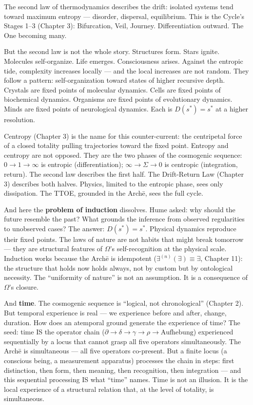 \documentclass[10pt, openany, oneside]{book}
\begin{document}
\vspace{1em}

\noindent The second law of thermodynamics describes the drift: isolated systems tend toward maximum entropy --- disorder, dispersal, equilibrium. This is the Cycle's Stages 1--3 (Chapter 3): Bifurcation, Veil, Journey. Differentiation outward. The One becoming many.

But the second law is not the whole story. Structures form. Stars ignite. Molecules self-organize. Life emerges. Consciousness arises. Against the entropic tide, complexity increases locally --- and the local increases are not random. They follow a pattern: self-organization toward states of higher recursive depth. Crystals are fixed points of molecular dynamics. Cells are fixed points of biochemical dynamics. Organisms are fixed points of evolutionary dynamics. Minds are fixed points of neurological dynamics. Each is $D(s^*) = s^*$ at a higher resolution.

Centropy (Chapter 3) is the name for this counter-current: the centripetal force of a closed totality pulling trajectories toward the fixed point. Entropy and centropy are not opposed. They are the two phases of the cosmogenic sequence: $0 \to 1 \to \infty$ is entropic (differentiation); $\infty \to \Sigma \to 0$ is centropic (integration, return). The second law describes the first half. The Drift-Return Law (Chapter 3) describes both halves. Physics, limited to the entropic phase, sees only dissipation. The TTOE, grounded in the Arch\={e}, sees the full cycle.

And here the \textbf{problem of induction} dissolves. Hume asked: why should the future resemble the past? What grounds the inference from observed regularities to unobserved cases? The answer: $D(s^*) = s^*$. Physical dynamics reproduce their fixed points. The laws of nature are not habits that might break tomorrow --- they are structural features of $\Omega$'s self-recognition at the physical scale. Induction works because the Arch\={e} is idempotent ($\exists^{(n)}(\exists) \equiv \exists$, Chapter 11): the structure that holds now holds always, not by custom but by ontological necessity. The ``uniformity of nature'' is not an assumption. It is a consequence of $\Omega$'s closure.

And \textbf{time}. The cosmogenic sequence is ``logical, not chronological'' (Chapter 2). But temporal experience is real --- we experience before and after, change, duration. How does an atemporal ground generate the experience of time? The seed: time IS the operator chain ($\partial \to \delta \to \gamma \to \rho \to \text{Aufhebung}$) experienced sequentially by a locus that cannot grasp all five operators simultaneously. The Arch\={e} is simultaneous --- all five operators co-present. But a finite locus (a conscious being, a measurement apparatus) processes the chain in steps: first distinction, then form, then meaning, then recognition, then integration --- and this sequential processing IS what ``time'' names. Time is not an illusion. It is the local experience of a structural relation that, at the level of totality, is simultaneous.
\end{document}

